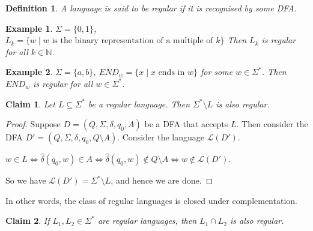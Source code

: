 \documentclass[a4paper]{article}
\newtheorem{claim}{Claim}
\newtheorem{defn}{Definition}
\newtheorem{eg}{Example}
\newcommand{\mc}{\mathcal}
\newcommand{\mb}{\mathbb}
\begin{document}
\begin{defn}
    A language is said to be regular if it is recognised by some DFA.
\end{defn}

\begin{eg}
    $\Sigma = \{0, 1\}$, $L_k = \{w \mid w \text{ is the binary representation of a multiple of }k\}$
    Then $L_k$ is regular for all $k \in \mb{N}$.
\end{eg}

\begin{eg}
    $\Sigma = \{a, b\}$, $END_w = \{x \mid x \text{ ends in } w\}$ for some $w \in \Sigma^*$. Then $END_w$ is regular for all $w \in \Sigma^*$.
\end{eg}

\begin{claim}
    Let $L \subseteq \Sigma^*$ be a regular language. Then $\Sigma^* \setminus L$ is also regular.
\end{claim}
\begin{proof}
    Suppose $D = (Q, \Sigma, \delta, q_0, A)$ be a DFA that accepts $L$. Then consider the DFA $D' = (Q, \Sigma, \delta, q_0, Q \setminus A)$. Consider the language $\mc{L}(D')$.


    $w \in L \iff \hat{\delta}(q_0, w) \in A \iff \hat{\delta}(q_0, w) \not\in Q \setminus A \iff w \not\in \mc{L}(D')$.

        So we have $\mc{L}(D') = \Sigma^* \setminus L$, and hence we are done.
\end{proof}
In other words, the class of regular languages is closed under complementation.
\begin{claim}
If $L_1, L_2 \in \Sigma^*$ are regular languages, then $L_1 \cap L_2$ is also regular. 
\end{claim}
\end{document}
